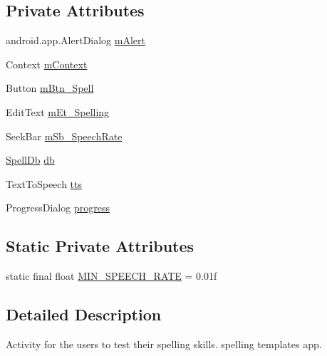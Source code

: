 \subsection*{Private Attributes}
\begin{DoxyCompactItemize}
\item 
android.\+app.\+Alert\+Dialog \hyperlink{classorg_1_1buildmlearn_1_1learnspellings_1_1activities_1_1MainActivity_a6d98f7066e28f499b830ec8bd82f3f6a}{m\+Alert}
\item 
Context \hyperlink{classorg_1_1buildmlearn_1_1learnspellings_1_1activities_1_1MainActivity_a2589ec04dbd49890874f89c6fd7817c3}{m\+Context}
\item 
Button \hyperlink{classorg_1_1buildmlearn_1_1learnspellings_1_1activities_1_1MainActivity_abee7bcab8c74203e5363bb8128e7c7be}{m\+Btn\+\_\+\+Spell}
\item 
Edit\+Text \hyperlink{classorg_1_1buildmlearn_1_1learnspellings_1_1activities_1_1MainActivity_a1d4eafe80d2aa5258a479db0acc9f226}{m\+Et\+\_\+\+Spelling}
\item 
Seek\+Bar \hyperlink{classorg_1_1buildmlearn_1_1learnspellings_1_1activities_1_1MainActivity_a9e70bb40aa131c1de782a7e470921edb}{m\+Sb\+\_\+\+Speech\+Rate}
\item 
\hyperlink{classorg_1_1buildmlearn_1_1learnspellings_1_1data_1_1SpellDb}{Spell\+Db} \hyperlink{classorg_1_1buildmlearn_1_1learnspellings_1_1activities_1_1MainActivity_ae0595a0ab6a4d482d4f3ede01687903a}{db}
\item 
Text\+To\+Speech \hyperlink{classorg_1_1buildmlearn_1_1learnspellings_1_1activities_1_1MainActivity_a7f94f1a4a1805382777e2ca757778c98}{tts}
\item 
Progress\+Dialog \hyperlink{classorg_1_1buildmlearn_1_1learnspellings_1_1activities_1_1MainActivity_a6dc6e0047ade775628ffcef1ebf466f6}{progress}
\end{DoxyCompactItemize}
\subsection*{Static Private Attributes}
\begin{DoxyCompactItemize}
\item 
static final float \hyperlink{classorg_1_1buildmlearn_1_1learnspellings_1_1activities_1_1MainActivity_a995c02d96a614ef6ed654b9a9b0640c5}{M\+I\+N\+\_\+\+S\+P\+E\+E\+C\+H\+\_\+\+R\+A\+TE} = 0.\+01f
\end{DoxyCompactItemize}


\subsection{Detailed Description}
Activity for the users to test their spelling skills. spelling template\textquotesingle{}s app. 

